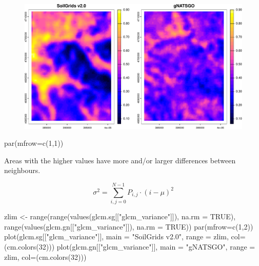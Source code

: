 \documentclass[
  letterpaper,
  DIV=11,
  numbers=noendperiod]{scrartcl}
\newenvironment{Shaded}{\begin{snugshade}}{\end{snugshade}}
\newcommand{\AttributeTok}[1]{\textcolor[rgb]{0.40,0.45,0.13}{#1}}
\newcommand{\ConstantTok}[1]{\textcolor[rgb]{0.56,0.35,0.01}{#1}}
\newcommand{\DecValTok}[1]{\textcolor[rgb]{0.68,0.00,0.00}{#1}}
\newcommand{\FunctionTok}[1]{\textcolor[rgb]{0.28,0.35,0.67}{#1}}
\newcommand{\NormalTok}[1]{\textcolor[rgb]{0.00,0.23,0.31}{#1}}
\newcommand{\OtherTok}[1]{\textcolor[rgb]{0.00,0.23,0.31}{#1}}
\newcommand{\StringTok}[1]{\textcolor[rgb]{0.13,0.47,0.30}{#1}}
\begin{document}
\begin{figure}[H]

{\centering \includegraphics{PatternAnalysisWorkshopTutorial_files/figure-pdf/unnamed-chunk-21-1.pdf}

}

\end{figure}

\begin{Shaded}
\begin{Highlighting}[]
\FunctionTok{par}\NormalTok{(}\AttributeTok{mfrow=}\FunctionTok{c}\NormalTok{(}\DecValTok{1}\NormalTok{,}\DecValTok{1}\NormalTok{))}
\end{Highlighting}
\end{Shaded}

Areas with the higher values have more and/or larger differences between
neighbours.

\[\sigma^2 = \sum_{i,j = 0}^{N-1} P_{i,j}\cdot (i - \mu)^2\]

\begin{Shaded}
\begin{Highlighting}[]
\NormalTok{zlim }\OtherTok{\textless{}{-}} \FunctionTok{range}\NormalTok{(}\FunctionTok{range}\NormalTok{(}\FunctionTok{values}\NormalTok{(glcm.sg[[}\StringTok{"glcm\_variance"}\NormalTok{]]), }\AttributeTok{na.rm =} \ConstantTok{TRUE}\NormalTok{), }
                     \FunctionTok{range}\NormalTok{(}\FunctionTok{values}\NormalTok{(glcm.gn[[}\StringTok{"glcm\_variance"}\NormalTok{]]), }\AttributeTok{na.rm =} \ConstantTok{TRUE}\NormalTok{))}
\FunctionTok{par}\NormalTok{(}\AttributeTok{mfrow=}\FunctionTok{c}\NormalTok{(}\DecValTok{1}\NormalTok{,}\DecValTok{2}\NormalTok{))}
\FunctionTok{plot}\NormalTok{(glcm.sg[[}\StringTok{"glcm\_variance"}\NormalTok{]], }\AttributeTok{main =} \StringTok{"SoilGrids v2.0"}\NormalTok{, }
     \AttributeTok{range =}\NormalTok{ zlim, }\AttributeTok{col=}\NormalTok{(}\FunctionTok{cm.colors}\NormalTok{(}\DecValTok{32}\NormalTok{)))}
\FunctionTok{plot}\NormalTok{(glcm.gn[[}\StringTok{"glcm\_variance"}\NormalTok{]], }\AttributeTok{main =} \StringTok{"gNATSGO"}\NormalTok{, }
     \AttributeTok{range =}\NormalTok{ zlim, }\AttributeTok{col=}\NormalTok{(}\FunctionTok{cm.colors}\NormalTok{(}\DecValTok{32}\NormalTok{)))}
\end{Highlighting}
\end{Shaded}
\end{document}
